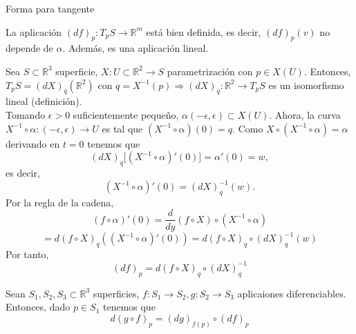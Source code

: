 \begin{obs}
  Forma para tangente
\end{obs}

\begin{prop}
  La aplicación $(d f)_{p} : T_{p}S \to \mathbb{R}^{m}$ está bien definida, es decir, $(d f)_{p}(v)$ no depende de $\alpha$. Además, es una aplicación lineal.
\end{prop}

\begin{dem}
  Sea $S \subset \mathbb{R}^{3}$ superficie, $X : U \subset \mathbb{R}^{2} \to S$ parametrización con $p \in X(U)$. Entonces, $T_{p}S = (d X)_{q}(\mathbb{R}^{2})$ con $q = X^{-1}(p) \Rightarrow (d X)_{q} : \mathbb{R}^{2} \to T_{p}S$ es un isomorfismo lineal (definición).\\

  Tomando $\epsilon > 0$ suficientemente pequeño, $\alpha(-\epsilon, \epsilon) \subset X(U)$. Ahora, la curva $X^{-1} \circ \alpha : (-\epsilon, \epsilon) \to U$ es tal que $(X^{-1} \circ \alpha)(0) = q$. Como $X \circ (X^{-1} \circ \alpha) = \alpha$ derivando en $t = 0 $ tenemos que
  \[
    (d X)_{q}\big[ (X^{-1} \circ \alpha)'(0) \big] = \alpha'(0) = w,
  \]
  es decir,
  \[ 
    (X^{-1} \circ \alpha)'(0) = (d X)_{q}^{-1}(w) .
  \] 
  Por la regla de la cadena,
  \[ 
     (f \circ \alpha)'(0) = \frac{d{}}{d{y}}(f \circ X) \circ (X^{-1} \circ \alpha)
  \] 
  \[ 
    = d(f \circ X)_{q} ((X^{-1} \circ \alpha)'(0)) = d(f \circ X)_{q} \circ (d X)_{q}^{-1}(w)
  \] 
  Por tanto,
  \[ 
    (d f)_{p} = d(f \circ X)_{q} \circ (d X)_{q}^{-1}
  \] 
\end{dem}



\begin{theo}
  Sean $S_{1}, S_{2}, S_{3} \subset \mathbb{R}^{3}$ superficies, $f : S_{1} \to S_{2}, g : S_{2} \to S_{3}$ aplicaiones diferenciables. Entonces, dado $p \in S_{1}$ tenemos que
  \[ 
    d(g \circ f)_{p} = (d g)_{f(p)} \circ (d f)_{p}
  \] 
\end{theo}


